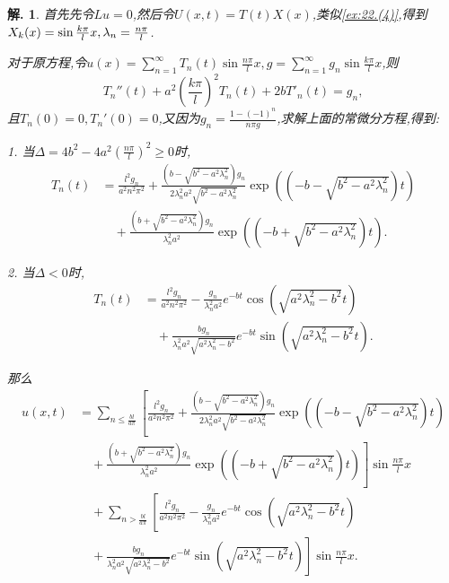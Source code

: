 \documentclass[a4paper,oneside,12pt]{ctexart}
\theoremstyle{plain}
\theoremstyle{nonumberplain}
\newtheorem{solution}{解.}
\theoremstyle{nonumberplain}
\begin{document}
    \begin{solution}
        首先先令$Lu=0$,然后令$U(x,t)=T(t)X(x)$,类似\cref{ex:22.(4)},得到$X_k(x)=\sin\frac{k\pi}{l}x,\\\lambda_n=\frac{n\pi }{l}$.

        对于原方程,令$u(x)=\sum_{n=1}^\infty T_n(t)\sin\frac{n\pi}{l}x,g=\sum_{n=1}^\infty g_n\sin\frac{k\pi}{l}x$,则 
        \begin{equation*}
            T_n''(t)+a^2\left(\frac{k\pi}{l}\right)^2T_n(t)+2bT'_n(t)=g_n,
        \end{equation*}
        且$T_n(0)=0,T_n'(0)=0$,又因为$g_n=\frac{1-(-1)^n}{n\pi g}$,求解上面的常微分方程,得到:

        1. 当$\Delta=4b^2-4a^2\left(\frac{n\pi}{l}\right)^2\geqslant 0$时, 
        \begin{align*}
            T_n(t)&=\frac{l^2g_n}{a^2n^2\pi^2}+\frac{(b-\sqrt{b^2-a^2\lambda_n^2})g_n}{2\lambda_n^2a^2\sqrt{b^2-a^2\lambda_n^2}}\exp(\left(-b-\sqrt{b^2-a^2\lambda_n^2}\right)t)\\
            &\quad +\frac{(b+\sqrt{b^2-a^2\lambda_n^2})g_n}{\lambda_n^2a^2}\exp((-b+\sqrt{b^2-a^2\lambda_n^2})t).
        \end{align*}

        2. 当$\Delta<0$时, 
        \begin{align*}
            T_n(t)&=\frac{l^2g_n}{a^2n^2\pi^2}-\frac{g_n}{\lambda_n^2a^2}e^{-bt}\cos(\sqrt{a^2\lambda_n^2-b^2}t)\\
            &\quad+\frac{bg_n}{\lambda_n^2a^2\sqrt{a^2\lambda_n^2-b^2}}e^{-bt}\sin(\sqrt{a^2\lambda_n^2-b^2}t).
        \end{align*}
        
        那么 
        \begin{align*}
            u(x,t)&=\sum_{n\leqslant\frac{bl}{a\pi}}\left[\frac{l^2g_n}{a^2n^2\pi^2}+\frac{(b-\sqrt{b^2-a^2\lambda_n^2})g_n}{2\lambda_n^2a^2\sqrt{b^2-a^2\lambda_n^2}}\exp(\left(-b-\sqrt{b^2-a^2\lambda_n^2}\right)t)\right.\\
            &\quad +\left.\frac{(b+\sqrt{b^2-a^2\lambda_n^2})g_n}{\lambda_n^2a^2}\exp((-b+\sqrt{b^2-a^2\lambda_n^2})t)\right]\sin\frac{n\pi}{l}x\\
            &\quad +\sum_{n>\frac{bl}{a\pi}}\left[\frac{l^2g_n}{a^2n^2\pi^2}-\frac{g_n}{\lambda_n^2a^2}e^{-bt}\cos(\sqrt{a^2\lambda_n^2-b^2}t)\right.\\
            &\quad +\left.\frac{bg_n}{\lambda_n^2a^2\sqrt{a^2\lambda_n^2-b^2}}e^{-bt}\sin(\sqrt{a^2\lambda_n^2-b^2}t)\right]\sin\frac{n\pi}{l}x.
        \end{align*}
    \end{solution}
\end{document}
